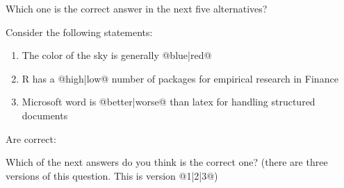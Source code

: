 \documentclass[10pt]{examdesign}
\begin{document}
\vspace{1cm}

\begin{multiplechoice}[resetcounter=no,  examcolumns=1]

\begin{question}

	Which one is the correct answer in the next five alternatives?






\end{question}

\begin{question}

	Consider the following statements:

	\begin{enumerate}[I]
		\item The color of the sky is generally @{blue}|{red}@

		\item R has a @{high}|{low}@ number of packages for empirical research in Finance

		\item Microsoft word is @{better}|{worse}@ than latex for handling structured documents
	\end{enumerate}

	Are correct:






\end{question}


\begin{question}

	Which of the next answers do you think is the correct one? (there are three versions of this question. This is version @{1}|{2}|{3}@)





\end{question}
\end{multiplechoice}
\end{document}
